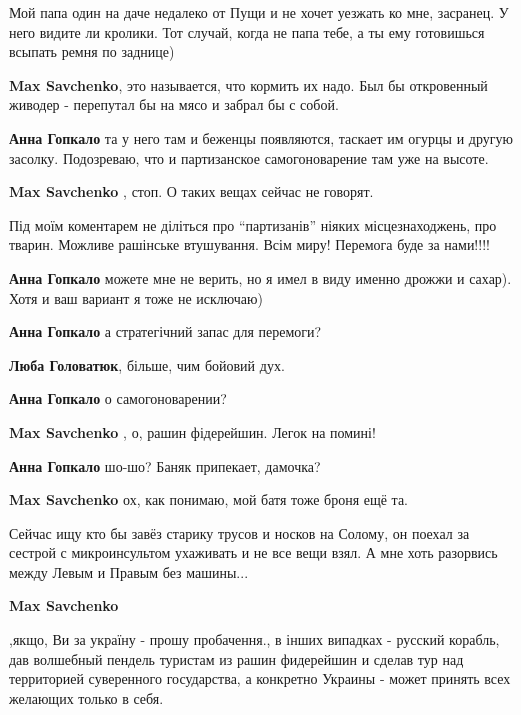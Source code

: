 
Мой папа один на даче недалеко от Пущи и не хочет уезжать ко мне, засранец. У
него видите ли кролики. Тот случай, когда не папа тебе, а ты ему готовишься
всыпать ремня по заднице)

\begin{itemize} %
\textbf{Max Savchenko}, это называется, что кормить их надо. Был бы откровенный живодер - перепутал бы на мясо и забрал бы с собой.

\textbf{Анна Гопкало} та у него там и беженцы появляются, таскает им огурцы и другую засолку. Подозреваю, что и партизанское самогоноварение там уже на высоте.

\begin{itemize} %
\textbf{Max Savchenko} , стоп. О таких вещах сейчас не говорят.


Під моїм коментарем не діліться про \enquote{партизанів} ніяких
місцезнаходжень, про тварин. Можливе рашінське втушування. Всім миру! Перемога
буде за нами!!!!

\textbf{Анна Гопкало} можете мне не верить, но я имел в виду именно дрожжи и сахар). Хотя и ваш вариант я тоже не исключаю)

\textbf{Анна Гопкало} а стратегічний запас для перемоги?

\textbf{Люба Головатюк}, більше, чим бойовий дух.
\end{itemize} %

\textbf{Анна Гопкало} о самогоноварении?

\textbf{Max Savchenko} , о, рашин фідерейшин. Легок на помині!

\textbf{Анна Гопкало} шо-шо? Баняк припекает, дамочка?

\textbf{Max Savchenko} ох, как понимаю, мой батя тоже броня ещё та.

Сейчас ищу кто бы завёз старику трусов и носков на Солому, он поехал за сестрой
с микроинсультом ухаживать и не все вещи взял. А мне хоть разорвись между Левым
и Правым без машины...

\textbf{Max Savchenko} 

,якщо, Ви за україну - прошу пробачення., в інших випадках - русский корабль, дав
волшебный пендель туристам из рашин фидерейшин и сделав тур над территорией
суверенного государства, а конкретно Украины - может принять всех желающих только
в себя.


\end{itemize}
